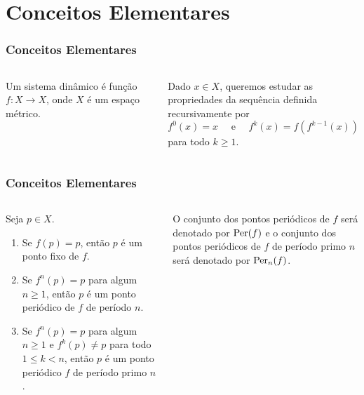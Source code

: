 \section{Conceitos Elementares}


\begin{frame}
\frametitle{Conceitos Elementares}
\begin{columns}
\column{\dimexpr\paperwidth-15pt}

\begin{definition}
Um sistema dinâmico é função $f: X \to X$, onde $X$ é um espaço métrico.
\end{definition}

Dado $x \in X$, queremos estudar as propriedades da sequência definida recursivamente por
$$f^0(x) = x \quad \text{ e } \quad f^k(x) = f(f^{k-1}(x))$$
para todo $k \geq 1$.

\end{columns}
\end{frame}


\begin{frame}
\vspace{5pt}
\frametitle{Conceitos Elementares}      
\begin{columns}
\column{\dimexpr\paperwidth-15pt}

\begin{definition}
Seja $p \in X$.
\begin{enumerate}
\item Se $f(p) = p$, então $p$ é um ponto fixo de $f$.

\item Se $f^n(p) = p$ para algum $n \geq 1$, então $p$ é um ponto periódico de $f$ de período $n$.

\item Se $f^n(p) = p$ para algum $n \geq 1$ e $f^k(p) \neq p$ para todo $1 \leq k < n$, então $p$ é um ponto periódico $f$ de período primo $n$.
\end{enumerate}
\end{definition}

O conjunto dos pontos periódicos de $f$ será denotado por $\operatorname{Per}(f)$ e o conjunto dos pontos periódicos de $f$ de período primo $n$ será denotado por $\operatorname{Per}_n(f)$.

\end{columns}
\end{frame}



